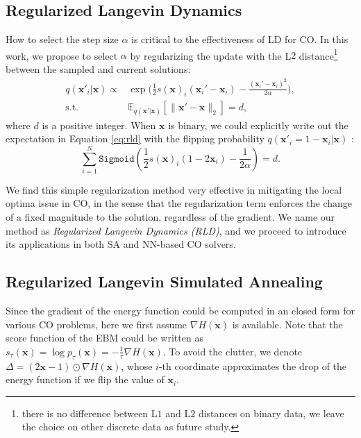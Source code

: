 \subsection{Regularized Langevin Dynamics}
How to select the step size $\alpha$ is critical to the effectiveness of LD for CO. In this work, we propose to select $\alpha$ by regularizing the update with the L$2$ distance\footnote{there is no difference between  L$1$ and L$2$ distances on binary data, we leave the choice on other discrete data as future study.} between the sampled and current solutions:
\begin{equation}
\begin{split}
    \label{eq:rld}
    q(\mathbf{x}'_i|\mathbf{x}) \propto &\exp({\frac{1}{2}s(\mathbf{x})_i(\mathbf{x}_i'-\mathbf{x}_i)-\frac{(\mathbf{x}_i'-\mathbf{x}_i)^2}{2\alpha})}, \\
    \text{s.t.} \qquad & \mathbb{E}_{q(\mathbf{x}'|\mathbf{x})}[\|\mathbf{x}'-\mathbf{x}\|_2]=d,
\end{split}
\end{equation}
where $d$ is a positive integer. When $\mathbf{x}$ is binary, we could explicitly write out the expectation in Equation \ref{eq:rld} with the flipping probability $q(\mathbf{x}'_i=1-\mathbf{x}_i|\mathbf{x})$ :
\begin{equation}
\label{eq:regularization_simgoid}
    \sum_{i=1}^N\texttt{Sigmoid}(\frac{1}{2}s(\mathbf{x})_i(1-2\mathbf{x}_i)-\frac{1}{2\alpha})=d.
\end{equation}

We find this simple regularization method very effective in mitigating the local optima issue in CO, in the sense that the regularization term enforces the change of a fixed magnitude to the solution, regardless of the gradient. We name our method as \textit{Regularized Langevin Dynamics (RLD)}, and we proceed to introduce its applications in both SA and NN-based CO solvers.



\subsection{Regularized Langevin Simulated Annealing}
\label{sec:rlsa}
Since the gradient of the energy function  could be computed in an closed form for various CO problems, here we first assume $\nabla H(\mathbf{x})$ is available. Note that the score function of the EBM could be written as $s_{\tau}(\mathbf{x})=\log p_{\tau}(\mathbf{x})=-\frac{1}{\tau}\nabla H(\mathbf{x})$. To avoid the clutter, we denote $\Delta=(2\mathbf{x}-1)\odot\nabla H(\mathbf{x})$, whose $i$-th coordinate approximates the drop of the energy function if we flip the value of $\mathbf{x}_i$.

